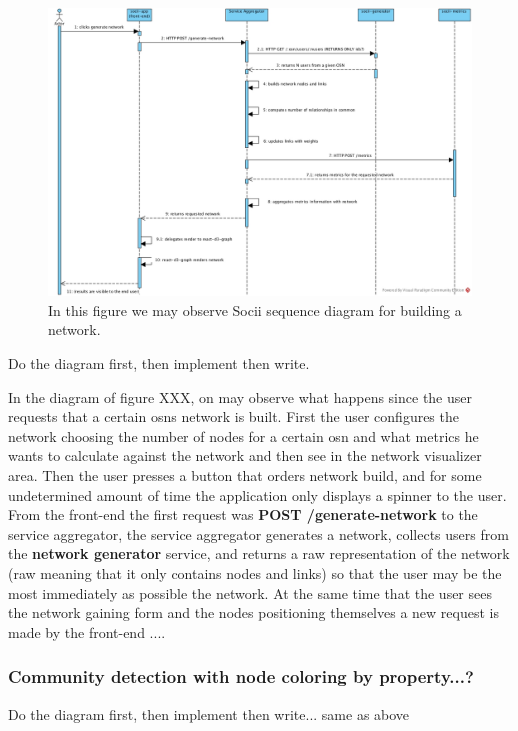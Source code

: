 \begin{figure}[h!]
\begin{center}
  \hspace*{-0.8in}
  \includegraphics[width=1.2\textwidth]{img/socii-sd.jpg}
\end{center}
\caption{\label{img:sociisd} In this figure we may observe Socii sequence diagram for building a network.}
\end{figure}

\begin{huge}
Do the diagram first, then implement then write.
\end{huge}
In the diagram of figure XXX, on may observe what happens since the user requests that a certain \glspl{osn} network is built.
First the user configures the network choosing the number of nodes for a certain \gls{osn} and what metrics he wants to calculate against the network
and then see in the network visualizer area. Then the user presses a button that orders network build, and for some undetermined amount of time
the application only displays a spinner to the user. From the front-end the first request was \textbf{POST /generate-network} to the service aggregator, the service aggregator generates a network, collects users from the \textbf{network generator} service, and returns a raw representation of the network (raw meaning that it only contains nodes and links) so that the user may be the most immediately as possible the network. At the same time that the user sees the network gaining form and the nodes positioning themselves a new request is made by the front-end ....

\subsubsection{Community detection with node coloring by property...?}
\begin{huge}
Do the diagram first, then implement then write... same as above
\end{huge}


